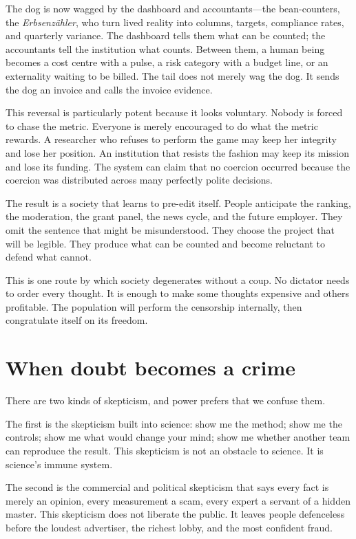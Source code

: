 ﻿\documentclass[12pt,a4paper]{book}
\begin{document}
The dog is now wagged by the dashboard and accountants---the bean-counters,
the \emph{Erbsenz\"ahler}, who turn lived reality into columns,
targets, compliance rates, and quarterly variance. The dashboard tells them
what can be counted; the accountants tell the institution what counts. Between
them, a human being becomes a cost centre with a pulse, a risk category with a
budget line, or an externality waiting to be billed. The tail does not merely
wag the dog. It sends the dog an invoice and calls the invoice evidence.

This reversal is particularly potent because it looks voluntary. Nobody is
forced to chase the metric. Everyone is merely encouraged to do what the
metric rewards. A researcher who refuses to perform the game may keep her
integrity and lose her position. An institution that resists the fashion may
keep its mission and lose its funding. The system can claim that no coercion
occurred because the coercion was distributed across many perfectly polite
decisions.

The result is a society that learns to pre-edit itself. People anticipate the
ranking, the moderation, the grant panel, the news cycle, and the future
employer. They omit the sentence that might be misunderstood. They choose the
project that will be legible. They produce what can be counted and become
reluctant to defend what cannot.

This is one route by which society degenerates without a coup. No dictator
needs to order every thought. It is enough to make some thoughts expensive and
others profitable. The population will perform the censorship internally,
then congratulate itself on its freedom.

\section{When doubt becomes a crime}

There are two kinds of skepticism, and power prefers that we confuse them.

The first is the skepticism built into science: show me the method; show me
the controls; show me what would change your mind; show me whether another
team can reproduce the result. This skepticism is not an obstacle to science.
It is science's immune system.

The second is the commercial and political skepticism that says every fact is
merely an opinion, every measurement a scam, every expert a servant of a
hidden master. This skepticism does not liberate the public. It leaves people
defenceless before the loudest advertiser, the richest lobby, and the most
confident fraud.
\end{document}
